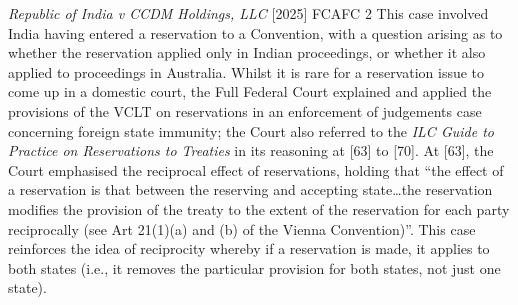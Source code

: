 \begin{casedetails}{\textit{Republic of India v CCDM Holdings, LLC} [2025] FCAFC 2}\label{case:India v CCDM}
    \flushleft
    This case involved India having entered a reservation to a Convention, with a question arising as to whether the reservation applied only in Indian proceedings, or whether it also applied to proceedings in Australia. Whilst it is rare for a reservation issue to come up in a domestic court, the Full Federal Court explained and applied the provisions of the VCLT on reservations in an enforcement of judgements case concerning foreign state immunity; the Court also referred to the \textit{ILC Guide to Practice on Reservations to Treaties} in its reasoning at [63] to [70]. At [63], the Court emphasised the reciprocal effect of reservations, holding that ``the effect of a reservation is that between the reserving and accepting state…the reservation modifies the provision of the treaty to the extent of the reservation for each party reciprocally (see Art 21(1)(a) and (b) of the Vienna Convention)''. This case reinforces the idea of reciprocity whereby if a reservation is made, it applies to both states (i.e., it removes the particular provision for both states, not just one state).
\end{casedetails}


